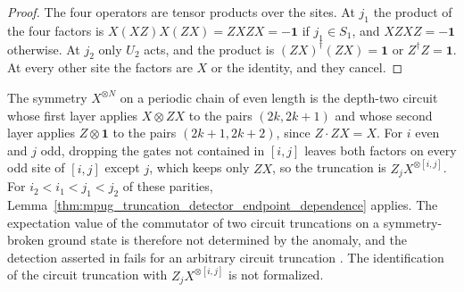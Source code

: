\begin{proof}\leanok
    The four operators are tensor products over the sites. At $j_1$ the
    product of the four factors is $X(XZ)X(ZX)=ZXZX=-\mathbf 1$ if $j_1\in S_1$,
    and $XZXZ=-\mathbf 1$ otherwise. At $j_2$ only $U_2$ acts, and the product is
    $(ZX)^\dagger(ZX)=\mathbf 1$ or $Z^\dagger Z=\mathbf 1$. At every other site
    the factors are $X$ or the identity, and they cancel.
\end{proof}

\begin{remark}
    \label{rem:mpug_truncation_detector_circuit}
    The symmetry $X^{\otimes N}$ on a periodic chain of even length is the
    depth-two circuit whose first layer applies $X\otimes ZX$ to the pairs
    $(2k,2k+1)$ and whose second layer applies $Z\otimes\mathbf 1$ to the pairs
    $(2k+1,2k+2)$, since $Z\cdot ZX=X$. For $i$ even and $j$ odd, dropping the
    gates not contained in $[i,j]$ leaves both factors on every odd site of
    $[i,j]$ except $j$, which keeps only $ZX$, so the truncation is
    $Z_jX^{\otimes[i,j]}$. For $i_2<i_1<j_1<j_2$ of these parities,
    Lemma~\ref{thm:mpug_truncation_detector_endpoint_dependence} applies.
    The expectation value of the commutator of two circuit truncations on a
    symmetry-broken ground state is therefore not determined by the anomaly,
    and the detection asserted in
    \cite[Section~V]{GarreRubioSchuch2024DomainWall} fails for an arbitrary
    circuit truncation \cite{gap:gs24_truncation_detector_endpoint_dependence}.
    The identification of the circuit truncation with $Z_jX^{\otimes[i,j]}$
    is not formalized.
\end{remark}

